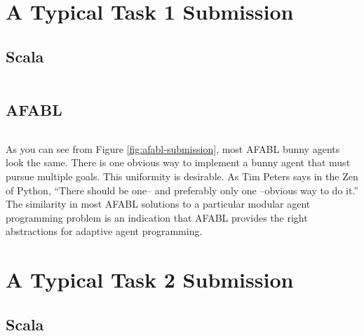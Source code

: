 \section{A Typical Task 1 Submission}

\subsection{Scala}

\begin{figure}[ht]
\begin{center}

\begin{lstlisting}[language=Scala]

\end{lstlisting}

\caption{}
\end{center}
\label{fig:scala-task1-submission}
\end{figure}


\subsection{AFABL}

\begin{figure}[ht]
\begin{center}

\begin{lstlisting}[language=Scala]

\end{lstlisting}

\caption{}
\end{center}
\label{fig:afabl-task1-submission}
\end{figure}


As you can see from Figure \ref{fig:afabl-submission}, most AFABL bunny agents look the same. There is one obvious way to implement a bunny agent that must pursue multiple goals. This uniformity is desirable. As Tim Peters says in the Zen of Python, ``There should be one-- and preferably only one --obvious way to do it.'' The similarity in most AFABL solutions to a particular modular agent programming problem is an indication that AFABL provides the right abstractions for adaptive agent programming.

\section{A Typical Task 2 Submission}

\subsection{Scala}

